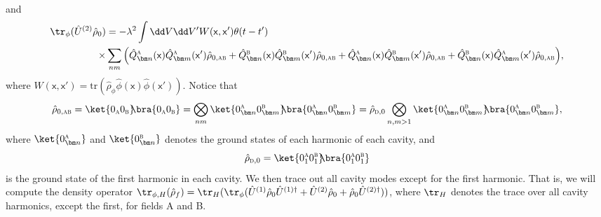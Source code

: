 \documentclass[letterpaper,12pt,titlepage,oneside,final]{book}
\newcommand{\mf}{\mathsf}%
\newcommand{\tc}[1]{\textsc{#1}}
\begin{document}
{{\begin{align}
\end{align}}
and{\footnotesize
\begin{align}
    \tr_\phi(\hat{U}^{(2)}\hat{\rho}_0) &= - \lambda^2\int \dd V \dd V' W(\mf x, \mf x')\theta(t-t')  \nonumber\\\times&\sum_{nm} \Big( \hat{Q}^{\tc{a}}_{\bm n}(\mf x)\hat{Q}^{\tc{a}}_{\bm m}(\mf x')\hat{\rho}_{0,\tc{ab}}+ \hat{Q}^\tc{b}_{\bm n}(\mf x)\hat{Q}_{\bm m}^{\tc{b}}(\mf x')\hat{\rho}_{0,\tc{ab}}+  \hat{Q}^\tc{a}_{\bm n}(\mf x)\hat{Q}^\tc{b}_{\bm m}(\mf x')\hat{\rho}_{0,\tc{ab}} +  \hat{Q}^\tc{b}_{\bm n}(\mf x) \hat{Q}^\tc{a}_{\bm m}(\mf x')\hat{\rho}_{0,\tc{ab}}\Big),
\end{align}}
where $W(\mf x, \mf x') = \text{tr}(\hat{\rho}_\phi \hat{\phi}(\mf x) \hat{\phi}(\mf x'))$. Notice that 
\begin{equation}
    \hat{\rho}_{0,\tc{ab}} = \ket{0_\tc{a}0_\tc{b}}\!\!\bra{0_\tc{a}0_\tc{b}} = \bigotimes_{nm} \ket{0_{\bm n}^\tc{a}0_{\bm m}^\tc{b}}\!\!\bra{0_{\bm n}^\tc{a}0_{\bm m}^\tc{b}} = \hat{\rho}_{\tc{d},0}\bigotimes_{n,m>1} \ket{0_{\bm n}^\tc{a}0_{\bm m}^\tc{b}}\!\!\bra{0_{\bm n}^\tc{a}0_{\bm m}^\tc{b}},
\end{equation}
where $\ket{0_{\bm n}^{\tc{a}}}$ and $\ket{0_{\bm n}^{\tc{b}}}$ denotes the ground states of each harmonic of each cavity, and 
\begin{equation}
    \hat{\rho}_{\tc{d},0} = \ket{0_1^\tc{a}0_1^\tc{b}}\!\!\bra{0_1^\tc{a}0_1^\tc{b}}
\end{equation}
is the ground state of the first harmonic in each cavity. We then trace out all cavity modes except for the first harmonic. That is, we will compute the density operator \mbox{$\tr_{\phi,H}(\hat{\rho}_f) = \tr_H(\tr_\phi(\hat{U}^{(1)}\hat{\rho}_0\hat{U}^{(1)\dagger}+ \hat{U}^{(2)}\hat{\rho}_0 + \hat{\rho}_0 \hat{U}^{(2)\dagger}))$}, where $\tr_H$ denotes the trace over all cavity harmonics, except the first, for fields A and B.

}
\end{document}
